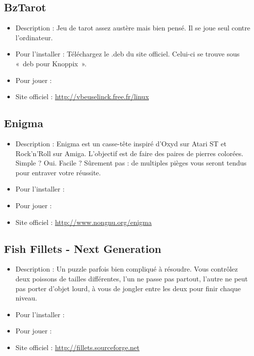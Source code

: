 \subsection{BzTarot}
\begin{itemize}
\begingroup
{}
\item Description : Jeu de tarot assez austère mais bien pensé. Il se joue seul contre l'ordinateur.{\par}
\item Pour l'installer : Téléchargez le .deb du site officiel. Celui-ci se trouve sous «~deb pour Knoppix~».{\par}
\item Pour jouer : 
\item Site officiel : \url{http://vbeuselinck.free.fr/linux}{\par}
\endgroup
\end{itemize}
\subsection{Enigma}
\begin{itemize}
\begingroup
{}
\item Description : Enigma est un casse-tête inspiré d'Oxyd sur Atari ST et Rock'n'Roll sur Amiga. L'objectif est de faire des paires de pierres colorées. Simple ? Oui. Facile ? Sûrement pas : de multiples pièges vous seront tendus pour entraver votre réussite.{\par}
\item Pour l'installer : 
\item Pour jouer : 
\item Site officiel : \url{http://www.nongnu.org/enigma}{\par}
\endgroup
\end{itemize}
\subsection{Fish Fillets - Next Generation}
\begin{itemize}
\begingroup
{}
\item Description : Un puzzle parfois bien compliqué à résoudre. Vous contrôlez deux poissons de tailles différentes, l'un ne passe pas partout, l'autre ne peut pas porter d'objet lourd, à vous de jongler entre les deux pour finir chaque niveau.{\par}
\item Pour l'installer : 
\item Pour jouer : 
\item Site officiel : \url{http://fillets.sourceforge.net}{\par}
\endgroup
\end{itemize}

